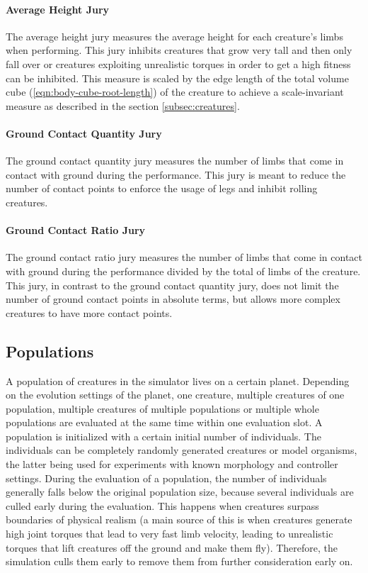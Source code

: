 \documentclass[main]{subfiles}
\begin{document}
\paragraph{Average Height Jury} The average height jury measures the average height for each creature's limbs when performing. %
%
This jury inhibits creatures that grow very tall and then only fall over or creatures exploiting unrealistic torques in order to get a high fitness can be inhibited. %
%
This measure is scaled by the edge length of the total volume cube (\eqref{eqn:body-cube-root-length}) of the creature to achieve a scale-invariant measure as described in the section \ref{subsec:creatures}.

\paragraph{Ground Contact Quantity Jury} The ground contact quantity jury measures the number of limbs that come in contact with ground during the performance. %
%
This jury is meant to reduce the number of contact points to enforce the usage of legs and inhibit rolling creatures.

\paragraph{Ground Contact Ratio Jury} The ground contact ratio jury measures the number of limbs that come in contact with ground during the performance divided by the total of limbs of the creature. %
%
This jury, in contrast to the ground contact quantity jury, does not limit the number of ground contact points in absolute terms, but allows more complex creatures to have more contact points.

\subsection{Populations}
\label{subsec:populations}

A population of creatures in the simulator lives on a certain planet. %
%
Depending on the evolution settings of the planet, one creature, multiple creatures of one population, multiple creatures of multiple populations or multiple whole populations are evaluated at the same time within one evaluation slot. %
%
A population is initialized with a certain initial number of individuals. %
%
The individuals can be completely randomly generated creatures or model organisms, the latter being used for experiments with known morphology and controller settings. %
%
During the evaluation of a population, the number of individuals generally falls below the original population size, because several individuals are culled early during the evaluation. %
%
This happens when creatures surpass boundaries of physical realism (a main source of this is when creatures generate high joint torques that lead to very fast limb velocity, leading to unrealistic torques that lift creatures off the ground and make them fly). %
%
Therefore, the simulation culls them early to remove them from further consideration early on.
\end{document}
